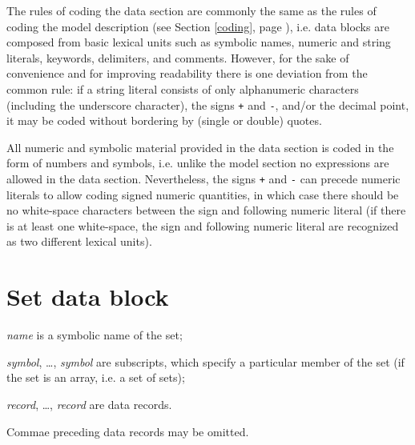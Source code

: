 \documentclass[11pt]{report}
\def\para#1{\noindent{\bf#1}}
\begin{document}
The rules of coding the data section are commonly the same as the rules
of coding the model description (see Section \ref{coding}, page
\pageref{coding}), i.e. data blocks are composed from basic lexical
units such as symbolic names, numeric and string literals, keywords,
delimiters, and comments. However, for the sake of convenience and for
improving readability there is one deviation from the common rule: if
a string literal consists of only alphanumeric characters (including
the underscore character), the signs {\tt+} and {\tt-}, and/or the
decimal point, it may be coded without bordering by (single or double)
quotes.

All numeric and symbolic material provided in the data section is coded
in the form of numbers and symbols, i.e. unlike the model section
no expressions are allowed in the data section. Nevertheless, the signs
{\tt+} and {\tt-} can precede numeric literals to allow coding signed
numeric quantities, in which case there should be no white-space
characters between the sign and following numeric literal (if there is
at least one white-space, the sign and following numeric literal are
recognized as two different lexical units).

\newpage

\section{Set data block}

\noindent
{}

\medskip

\noindent
{\it name} is a symbolic name of the set;

\noindent
{\it symbol}, \dots, {\it symbol} are subscripts, which specify
a particular member of the set (if the set is an array, i.e. a set of
sets);

\noindent
{\it record}, \dots, {\it record} are data records.

\noindent
Commae preceding data records may be omitted.

\para{Data records}
\end{document}
